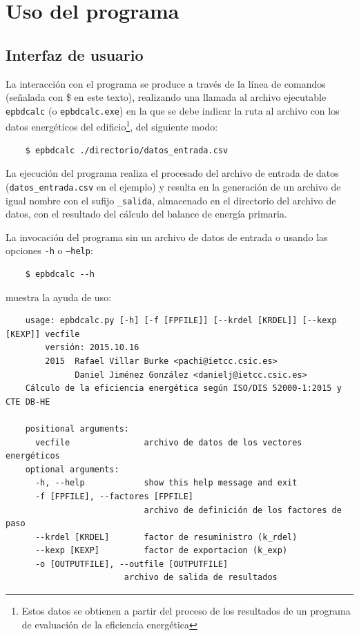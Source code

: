 \documentclass[10pt,notitlepage,oneside,a4paper]{article}
\begin{document}
\section{Uso del programa}
\label{sec:usoprograma}

\subsection{Interfaz de usuario}

La interacción con el programa se produce a través de la línea de comandos (señalada con \$ en este texto), realizando una llamada al archivo ejecutable \texttt{epbdcalc} (o \texttt{epbdcalc.exe}) en la que se debe indicar la ruta al archivo con los datos energéticos del edificio\footnote{Estos datos se obtienen a partir del proceso de los resultados de un programa de evaluación de la eficiencia energética}, del siguiente modo:

\begin{Verbatim}
	$ epbdcalc ./directorio/datos_entrada.csv
\end{Verbatim}

La ejecución del programa realiza el procesado del archivo de entrada de datos (\texttt{datos\_entrada.csv} en el ejemplo) y resulta en la generación de un archivo de igual nombre con el sufijo \texttt{\_salida}, almacenado en el directorio del archivo de datos, con el resultado del cálculo del balance de energía primaria.

La invocación del programa sin un archivo de datos de entrada o usando las opciones \texttt{-h} o \texttt{--help}:

\begin{Verbatim}
	$ epbdcalc --h
\end{Verbatim}

 muestra la ayuda de uso:

\begin{Verbatim}
    usage: epbdcalc.py [-h] [-f [FPFILE]] [--krdel [KRDEL]] [--kexp [KEXP]] vecfile
    	versión: 2015.10.16
    	2015  Rafael Villar Burke <pachi@ietcc.csic.es>
    	      Daniel Jiménez González <danielj@ietcc.csic.es>
    Cálculo de la eficiencia energética según ISO/DIS 52000-1:2015 y CTE DB-HE
    
    positional arguments:
      vecfile               archivo de datos de los vectores energéticos
    optional arguments:
      -h, --help            show this help message and exit
      -f [FPFILE], --factores [FPFILE]
                            archivo de definición de los factores de paso
      --krdel [KRDEL]       factor de resuministro (k_rdel)
      --kexp [KEXP]         factor de exportacion (k_exp)
      -o [OUTPUTFILE], --outfile [OUTPUTFILE]
                        archivo de salida de resultados
\end{Verbatim}
\end{document}
